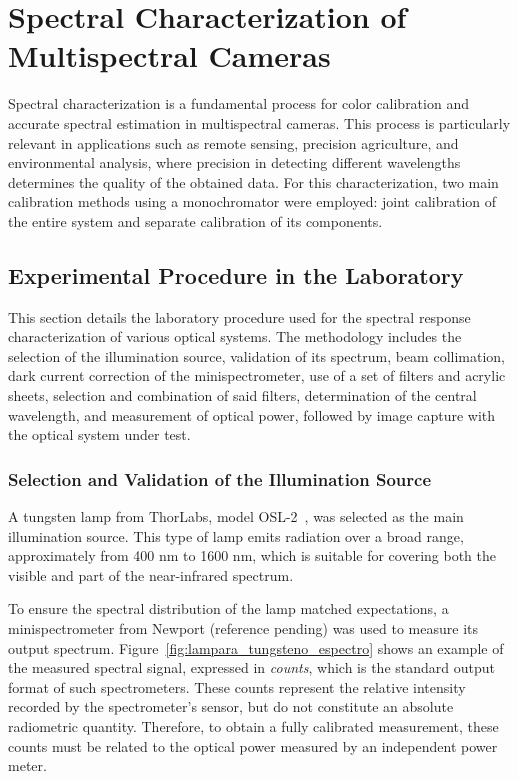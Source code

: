 \section{Spectral Characterization of Multispectral Cameras}

Spectral characterization is a fundamental process for color calibration and accurate spectral estimation in multispectral cameras. This process is particularly relevant in applications such as remote sensing, precision agriculture, and environmental analysis, where precision in detecting different wavelengths determines the quality of the obtained data. For this characterization, two main calibration methods using a monochromator were employed: joint calibration of the entire system and separate calibration of its components.

\subsection{Experimental Procedure in the Laboratory}
\label{sec:procedimiento_experimental_laboratorio}

This section details the laboratory procedure used for the spectral response characterization of various optical systems. The methodology includes the selection of the illumination source, validation of its spectrum, beam collimation, dark current correction of the minispectrometer, use of a set of filters and acrylic sheets, selection and combination of said filters, determination of the central wavelength, and measurement of optical power, followed by image capture with the optical system under test.

\subsubsection{Selection and Validation of the Illumination Source}
\label{subsub:fuente_validacion}

A tungsten lamp from ThorLabs, model OSL-2~\cite{OSL2-Manual}, was selected as the main illumination source. This type of lamp emits radiation over a broad range, approximately from 400 nm to 1600 nm, which is suitable for covering both the visible and part of the near-infrared spectrum.

To ensure the spectral distribution of the lamp matched expectations, a minispectrometer from Newport (reference pending) was used to measure its output spectrum. Figure~\ref{fig:lampara_tungsteno_espectro} shows an example of the measured spectral signal, expressed in \textit{counts}, which is the standard output format of such spectrometers. These counts represent the relative intensity recorded by the spectrometer's sensor, but do not constitute an absolute radiometric quantity. Therefore, to obtain a fully calibrated measurement, these counts must be related to the optical power measured by an independent power meter.

